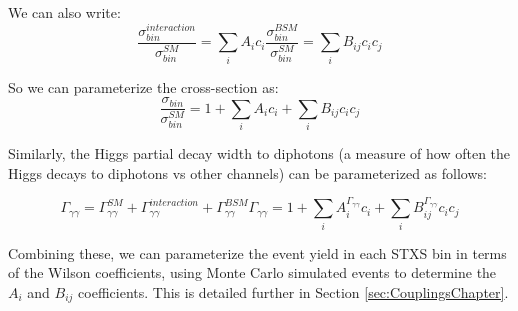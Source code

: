 We can also write:
\begin{equation}
\frac{\sigma_{bin}^{interaction}}{\sigma_{bin}^{SM}} = \sum_{i} A_{i} c_{i}
\frac{\sigma_{bin}^{BSM}}{\sigma_{bin}^{SM}} = \sum_{i} B_{ij} c_{i} c_{j}
\end{equation}

So we can parameterize the cross-section as:
\begin{equation}
\frac{\sigma_{bin}}{\sigma_{bin}^{SM}} = 1 + \sum_{i} A_{i} c_{i} + \sum_{i} B_{ij} c_{i} c_{j}
\end{equation}

Similarly, the Higgs partial decay width to diphotons (a measure of how often the Higgs decays to diphotons vs other channels) can be parameterized as follows:

\begin{equation}
\Gamma_{\gamma \gamma} = \Gamma_{\gamma \gamma}^{SM} + \Gamma_{\gamma \gamma}^{interaction} + \Gamma_{\gamma \gamma}^{BSM}
\Gamma_{\gamma \gamma} = 1 + \sum_{i} A_{i}^{\Gamma_{\gamma \gamma}} c_{i} + \sum_{i} B_{ij}^{\Gamma_{\gamma \gamma}} c_{i} c_{j}
\end{equation}

Combining these, we can parameterize the event yield in each STXS bin in terms of the Wilson coefficients, using Monte Carlo simulated events to determine the $A_{i}$ and $B_{ij}$ coefficients. This is detailed further in Section \ref{sec:CouplingsChapter}.
